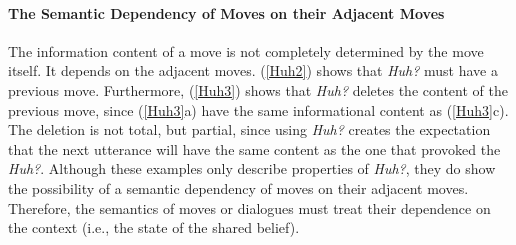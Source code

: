 \paragraph{The Semantic Dependency of Moves on their Adjacent Moves}\label{adj}
The information content of a move is not completely determined by the move itself.
It depends on the adjacent moves.
(\ref{Huh2}) shows that {\it Huh?} must have a previous move.
Furthermore, (\ref{Huh3}) shows that {\it Huh?} deletes the content of the previous move, since (\ref{Huh3}a) have the same informational content as (\ref{Huh3}c).
The deletion is not total, but partial, since using {\it Huh?} creates the expectation that the next utterance will have the same content as the one that provoked the {\it Huh?}.
Although these examples only describe properties of {\it Huh?}, they do show the possibility of a semantic dependency of moves on their adjacent moves.
Therefore, the semantics of moves or dialogues must treat their dependence on the context (i.e., the state of the shared belief).

